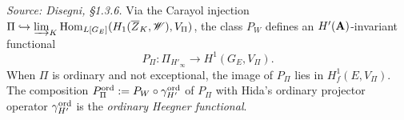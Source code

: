 \begin{definition}
  \label{def:HeegnerFunctional}
  \textit{Source: Disegni, §1.3.6.}
  Via the Carayol injection
  $\Pi \hookrightarrow \varinjlim_K \mathrm{Hom}_{L[G_E]}(H_1(\overline{Z}_K,
  \mathscr{W}), V_\Pi)$, the class $P_W$ defines an $H'(\mathbf{A})$-invariant
  functional
  \[
    P_\Pi \colon \Pi_{H'_\infty} \longrightarrow H^1(G_E, V_\Pi).
  \]
  When $\Pi$ is ordinary and not exceptional, the image of $P_\Pi$
  lies in $H^1_f(E, V_\Pi)$.
  The composition $P_\Pi^{\mathrm{ord}} := P_W \circ \gamma^{\mathrm{ord}}_{H'}$ of
  $P_\Pi$ with Hida's ordinary projector operator $\gamma^{\mathrm{ord}}_{H'}$
  is the \emph{ordinary Heegner functional}.
\end{definition}

